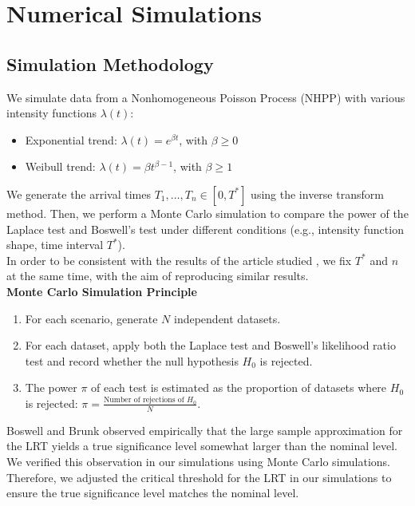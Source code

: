 \documentclass{journalstyle}
\begin{document}
\section{Numerical Simulations}

\subsection{Simulation Methodology}

We simulate data from a Nonhomogeneous Poisson Process (NHPP) with various intensity functions $\lambda(t)$:
\begin{itemize}
    \item Exponential trend: $\lambda(t) = e^{\beta t}$, with $\beta \geq 0$
    \item Weibull trend: $\lambda(t) = \beta t^{\beta - 1}$, with $\beta \geq 1$
\end{itemize}

We generate the arrival times $T_1, \ldots, T_n \in [0, T^*]$ using the inverse transform method.
Then, we perform a Monte Carlo simulation to compare the power of the Laplace test and Boswell's test under different conditions (e.g., intensity function shape, time interval $T^*$). \\
In order to be consistent with the results of the article studied \cite{BainEngelhardtWright}, we fix $T^*$ and $n$ at the same time, with the aim of reproducing similar results. \\

\noindent\textbf{Monte Carlo Simulation Principle} \\
\begin{enumerate}
    \item For each scenario, generate $N$ independent datasets.
    \item For each dataset, apply both the Laplace test and Boswell's likelihood ratio test and record whether the null hypothesis $H_0$ is rejected.
    \item The power $\pi$ of each test is estimated as the proportion of datasets where $H_0$ is rejected: $\pi = \frac{\text{Number of rejections of } H_0}{N}$.
\end{enumerate}

Boswell and Brunk \cite{Boswell1966} observed empirically that the large sample approximation for the LRT yields a true significance level somewhat larger than the nominal level.
We verified this observation in our simulations using Monte Carlo simulations.
Therefore, we adjusted the critical threshold for the LRT in our simulations to ensure the true significance level matches the nominal level.
\end{document}
